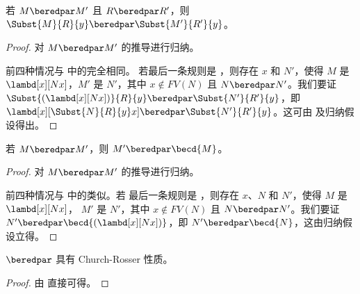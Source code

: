 \documentclass[../../../include/open-logic-section]{subfiles}
\begin{document}
\begin{lem}
  若 $M \beredpar M'$ 且 $R \beredpar R'$，则 $\Subst{M}{R}{y}
  \beredpar \Subst{M'}{R'}{y}$。
\end{lem}

\begin{proof}
  对 $M \beredpar M'$ 的推导进行归纳。

  前四种情况与  中的完全相同。
  若最后一条规则是 ，则存在 $x$ 和 $N'$，使得 $M$ 是
  $\lambd[x][Nx]$，$M'$ 是 $N'$，其中 $x \notin
  FV(N)$ 且 $N \beredpar N'$。我们要证
  $\Subst{(\lambd[x][Nx])}{R}{y} \beredpar \Subst{N'}{R'}{y}$，即
  $\lambd[x][\Subst{N}{R}{y} x] \beredpar \Subst{N'}{R'}{y}$。这可由
   及归纳假设得出。
\end{proof}

\begin{lem}
  若 $M \beredpar M'$，则 $M' \beredpar \becd{M}$。
\end{lem}

\begin{proof}
  对 $M \beredpar M'$ 的推导进行归纳。

  前四种情况与  中的类似。若
  最后一条规则是 ，则存在 $x$、$N$ 和 $N'$，使得 $M$ 是 $\lambd[x][Nx]$，
  $M'$ 是 $N'$，其中 $x \notin FV(N)$ 且 $N
  \beredpar N'$。我们要证 $N' \beredpar
  \becd{(\lambd[x][Nx])}$，即 $N' \beredpar \becd{N}$，这由归纳假设立得。
\end{proof}

\begin{thm}
  $\beredpar$ 具有 Church-Rosser 性质。
\end{thm}

\begin{proof}
  由  直接可得。
\end{proof}
\end{document}
